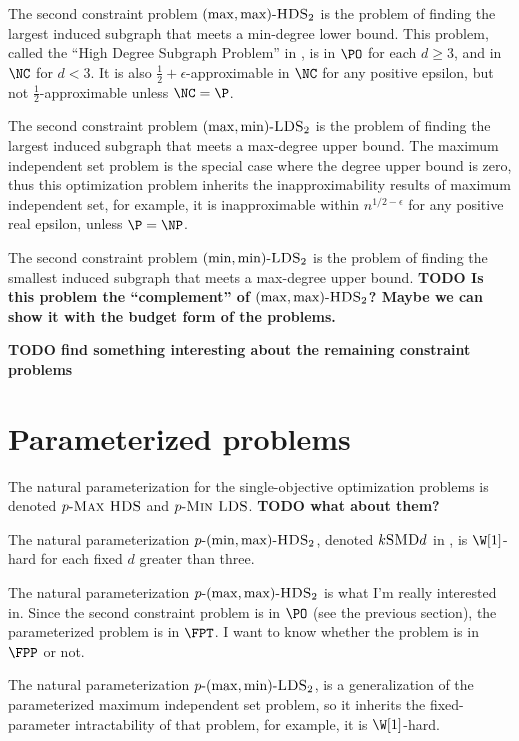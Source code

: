 \documentclass{article}
\newcommand{\todo}[1]{\textbf{TODO #1}}
\newcommand{\dash}{\textnormal{-}}
\newcommand{\pd}{p\dash}
\begin{document}
The second constraint problem $(\max, \max)\dash\textsc{HDS}_2$ is the problem of finding the largest induced subgraph that meets a min-degree lower bound.
This problem, called the ``High Degree Subgraph Problem'' in \autocite{am84}, is in $\PO$ for each $d \geq 3$, and in $\NC$ for $d < 3$.
It is also $\frac{1}{2} + \epsilon$-approximable in $\NC$ for any positive epsilon, but not $\frac{1}{2}$-approximable unless $\NC = \P$.

The second constraint problem $(\max, \min)\dash\textsc{LDS}_2$ is the problem of finding the largest induced subgraph that meets a max-degree upper bound.
The maximum independent set problem is the special case where the degree upper bound is zero, thus this optimization problem inherits the inapproximability results of maximum independent set, for example, it is inapproximable within $n^{1/2 - \epsilon}$ for any positive real epsilon, unless $\P = \NP$.

The second constraint problem $(\min, \min)\dash\textsc{LDS}_2$ is the problem of finding the smallest induced subgraph that meets a max-degree upper bound.
\todo{
  Is this problem the ``complement'' of $(\max, \max)\dash\textsc{HDS}_2$?
  Maybe we can show it with the budget form of the problems.
}

\todo{find something interesting about the remaining constraint problems}

\section{Parameterized problems}

The natural parameterization for the single-objective optimization problems is denoted $\pd\textsc{Max HDS}$ and $\pd\textsc{Min LDS}$.
\todo{what about them?}

The natural parameterization $\pd(\min, \max)\dash\textsc{HDS}_2$, denoted $k\textsc{SMD}d$ in \autocite{ass12}, is $\W[1]$-hard for each fixed $d$ greater than three.

The natural parameterization $\pd(\max, \max)\dash\textsc{HDS}_2$ is what I'm really interested in.
Since the second constraint problem is in $\PO$ (see the previous section), the parameterized problem is in $\FPT$.
I want to know whether the problem is in $\FPP$ or not.

The natural parameterization $\pd(\max, \min)\dash\textsc{LDS}_2$, is a generalization of the parameterized maximum independent set problem, so it inherits the fixed-parameter intractability of that problem, for example, it is $\W[1]$-hard.
\end{document}
